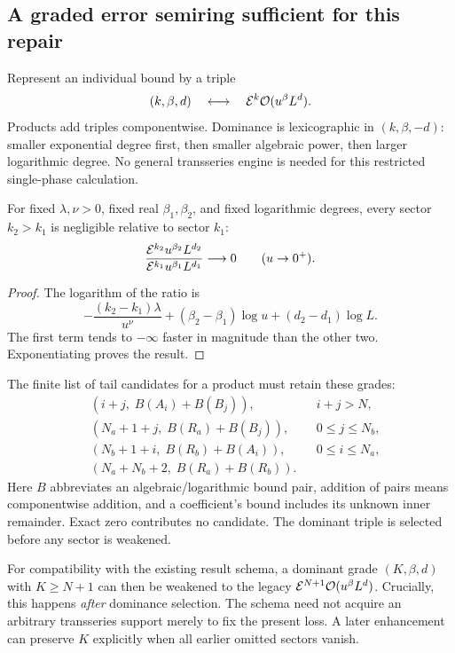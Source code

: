 \subsection{A graded error semiring sufficient for this repair}

Represent an individual bound by a triple
\[
 (k,\beta,d)\quad\longleftrightarrow\quad
 \mathcal{E}^k\mathcal{O}(u^\beta L^d).
\]
Products add triples componentwise. Dominance is lexicographic in $(k,\beta,-d)$: smaller exponential degree first, then smaller algebraic power, then larger logarithmic degree. No general transseries engine is needed for this restricted single-phase calculation.

\begin{lemma}\label{lem:flat-dominance}
For fixed $\lambda,\nu>0$, fixed real $\beta_1,\beta_2$, and fixed logarithmic degrees, every sector $k_2>k_1$ is negligible relative to sector $k_1$:
\[
 \frac{\mathcal{E}^{k_2}u^{\beta_2}L^{d_2}}
      {\mathcal{E}^{k_1}u^{\beta_1}L^{d_1}}\longrightarrow0
 \qquad(u\to0^+).
\]
\end{lemma}
\begin{proof}
The logarithm of the ratio is
\[
 -\frac{(k_2-k_1)\lambda}{u^\nu}
 +(\beta_2-\beta_1)\log u+(d_2-d_1)\log L.
\]
The first term tends to $-\infty$ faster in magnitude than the other two. Exponentiating proves the result.
\end{proof}

The finite list of tail candidates for a product must retain these grades:
\begin{align*}
 &(i+j,\;B(A_i)+B(B_j)), &&i+j>N,\\
 &(N_a+1+j,\;B(R_a)+B(B_j)), &&0\le j\le N_b,\\
 &(N_b+1+i,\;B(R_b)+B(A_i)), &&0\le i\le N_a,\\
 &(N_a+N_b+2,\;B(R_a)+B(R_b)).
\end{align*}
Here $B$ abbreviates an algebraic/logarithmic bound pair, addition of pairs means componentwise addition, and a coefficient's bound includes its unknown inner remainder. Exact zero contributes no candidate. The dominant triple is selected before any sector is weakened.

For compatibility with the existing result schema, a dominant grade $(K,\beta,d)$ with $K\ge N+1$ can then be weakened to the legacy $\mathcal{E}^{N+1}\mathcal{O}(u^\beta L^d)$. Crucially, this happens \emph{after} dominance selection. The schema need not acquire an arbitrary transseries support merely to fix the present loss. A later enhancement can preserve $K$ explicitly when all earlier omitted sectors vanish.

